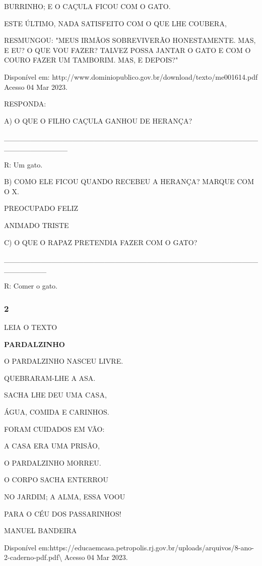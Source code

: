 BURRINHO; E O CAÇULA FICOU COM O GATO.

ESTE ÚLTIMO, NADA SATISFEITO COM O QUE LHE COUBERA,

RESMUNGOU: "MEUS IRMÃOS SOBREVIVERÃO HONESTAMENTE. MAS, E EU? O QUE VOU
FAZER? TALVEZ POSSA JANTAR O GATO E COM O COURO FAZER UM TAMBORIM. MAS,
E DEPOIS?"

Disponível em:
http://www.dominiopublico.gov.br/download/texto/me001614.pdf Acesso 04
Mar 2023.

RESPONDA:

A) O QUE O FILHO CAÇULA GANHOU DE HERANÇA?

\_\_\_\_\_\_\_\_\_\_\_\_\_\_\_\_\_\_\_\_\_\_\_\_\_\_\_\_\_\_\_\_\_\_\_\_\_\_\_\_\_\_\_\_\_\_\_\_\_\_\_\_\_\_\_\_\_\_\_\_

R: Um gato.

B) COMO ELE FICOU QUANDO RECEBEU A HERANÇA? MARQUE COM O X.

PREOCUPADO FELIZ

ANIMADO TRISTE

C) O QUE O RAPAZ PRETENDIA FAZER COM O GATO?

\_\_\_\_\_\_\_\_\_\_\_\_\_\_\_\_\_\_\_\_\_\_\_\_\_\_\_\_\_\_\_\_\_\_\_\_\_\_\_\_\_\_\_\_\_\_\_\_\_\_\_\_\_\_\_\_

R: Comer o gato.

\subsubsection{2 }\label{section-69}

LEIA O TEXTO

\textbf{PARDALZINHO}

O PARDALZINHO NASCEU LIVRE.

\protect\hypertarget{_Hlk128840862}{}{}QUEBRARAM-LHE A ASA.

SACHA LHE DEU UMA CASA,

ÁGUA, COMIDA E CARINHOS.

FORAM CUIDADOS EM VÃO:

A CASA ERA UMA PRISÃO,

O PARDALZINHO MORREU.

O CORPO SACHA ENTERROU

NO JARDIM; A ALMA, ESSA \protect\hypertarget{_Hlk128858343}{}{}VOOU

PARA O CÉU DOS PASSARINHOS!

MANUEL BANDEIRA

Disponível
em:https://educaemcasa.petropolis.rj.gov.br/uploads/arquivos/8-ano-2-caderno-pdf.pdf\textbackslash{}
Acesso 04 Mar 2023.

